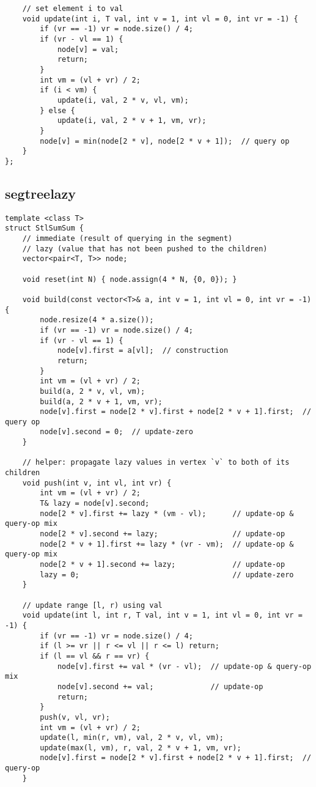 \documentclass[twoside]{article}
\begin{document}
\begin{multicols*}{2}
\begin{verbatim}
    // set element i to val
    void update(int i, T val, int v = 1, int vl = 0, int vr = -1) {
        if (vr == -1) vr = node.size() / 4;
        if (vr - vl == 1) {
            node[v] = val;
            return;
        }
        int vm = (vl + vr) / 2;
        if (i < vm) {
            update(i, val, 2 * v, vl, vm);
        } else {
            update(i, val, 2 * v + 1, vm, vr);
        }
        node[v] = min(node[2 * v], node[2 * v + 1]);  // query op
    }
};
\end{verbatim}

{
\subsection*{segtreelazy}
}
\begin{verbatim}
template <class T>
struct StlSumSum {
    // immediate (result of querying in the segment)
    // lazy (value that has not been pushed to the children)
    vector<pair<T, T>> node;

    void reset(int N) { node.assign(4 * N, {0, 0}); }

    void build(const vector<T>& a, int v = 1, int vl = 0, int vr = -1) {
        node.resize(4 * a.size());
        if (vr == -1) vr = node.size() / 4;
        if (vr - vl == 1) {
            node[v].first = a[vl];  // construction
            return;
        }
        int vm = (vl + vr) / 2;
        build(a, 2 * v, vl, vm);
        build(a, 2 * v + 1, vm, vr);
        node[v].first = node[2 * v].first + node[2 * v + 1].first;  // query op
        node[v].second = 0;  // update-zero
    }

    // helper: propagate lazy values in vertex `v` to both of its children
    void push(int v, int vl, int vr) {
        int vm = (vl + vr) / 2;
        T& lazy = node[v].second;
        node[2 * v].first += lazy * (vm - vl);      // update-op & query-op mix
        node[2 * v].second += lazy;                 // update-op
        node[2 * v + 1].first += lazy * (vr - vm);  // update-op & query-op mix
        node[2 * v + 1].second += lazy;             // update-op
        lazy = 0;                                   // update-zero
    }

    // update range [l, r) using val
    void update(int l, int r, T val, int v = 1, int vl = 0, int vr = -1) {
        if (vr == -1) vr = node.size() / 4;
        if (l >= vr || r <= vl || r <= l) return;
        if (l == vl && r == vr) {
            node[v].first += val * (vr - vl);  // update-op & query-op mix
            node[v].second += val;             // update-op
            return;
        }
        push(v, vl, vr);
        int vm = (vl + vr) / 2;
        update(l, min(r, vm), val, 2 * v, vl, vm);
        update(max(l, vm), r, val, 2 * v + 1, vm, vr);
        node[v].first = node[2 * v].first + node[2 * v + 1].first;  // query-op
    }


\end{verbatim}
\end{multicols*}
\end{document}
